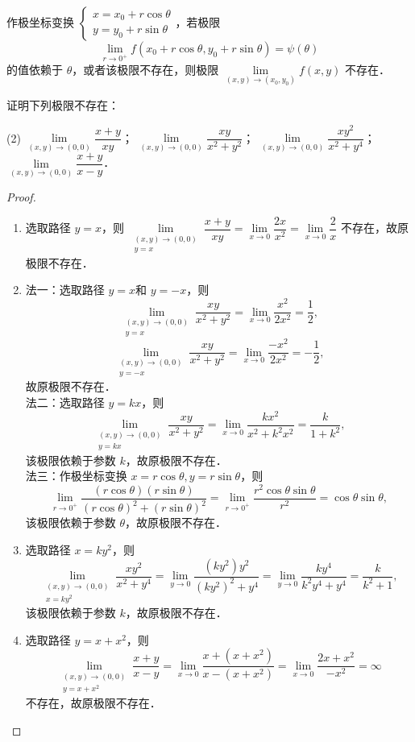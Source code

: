 \documentclass[12pt, a4paper, oneside, UTF8]{ctexbook}
\begin{document}
\begin{theorem}[极坐标法]
作极坐标变换 $\begin{cases} x=x_0+r\cos\theta \\ y=y_0+r\sin\theta \end{cases}$，若极限
\[ \lim_{r \to 0^+} f(x_0+r\cos\theta, y_0+r\sin\theta) = \psi(\theta) \]
的值依赖于 $\theta$，或者该极限不存在，则极限 $\lim\limits_{(x,y) \to (x_0,y_0)} f(x,y)$ 不存在．
\end{theorem}
\begin{example}
    证明下列极限不存在：
    \begin{tasks}[label=(\arabic*)](2)
        \task $\lim\limits_{(x,y) \to (0,0)} \dfrac{x+y}{xy}$；
        \task $\lim\limits_{(x,y) \to (0,0)} \dfrac{xy}{x^2+y^2}$；
        \task $\lim\limits_{(x,y) \to (0,0)} \dfrac{xy^2}{x^2+y^4}$；
        \task $\lim\limits_{(x,y) \to (0,0)} \dfrac{x+y}{x-y}$．
    \end{tasks}
\end{example}
\begin{proof}
    \begin{enumerate}[label=(\arabic*)]
        \item 选取路径 $y=x$，则 $\lim\limits_{\substack{(x,y) \to (0,0) \\ y=x}} \dfrac{x+y}{xy} = \lim\limits_{x \to 0} \dfrac{2x}{x^2} = \lim\limits_{x \to 0} \dfrac{2}{x}$ 不存在，故原极限不存在．
        \item 法一：选取路径 $y=x$和 $y=-x$，则
        \[ \lim_{\substack{(x,y) \to (0,0) \\ y=x}} \dfrac{xy}{x^2+y^2} = \lim_{x \to 0} \dfrac{x^2}{2x^2} = \dfrac{1}{2}, \]
        \[ \lim_{\substack{(x,y) \to (0,0) \\ y=-x}} \dfrac{xy}{x^2+y^2} = \lim_{x \to 0} \dfrac{-x^2}{2x^2} = -\dfrac{1}{2}, \]
        故原极限不存在．\\
        法二：选取路径 $y=kx$，则
        \[ \lim_{\substack{(x,y) \to (0,0) \\ y=kx}} \dfrac{xy}{x^2+y^2} = \lim_{x \to 0} \dfrac{kx^2}{x^2+k^2x^2} = \dfrac{k}{1+k^2}, \]
        该极限依赖于参数 $k$，故原极限不存在．\\
        法三：作极坐标变换 $x=r\cos\theta, y=r\sin\theta$，则
        \[ \lim_{r \to 0^+} \dfrac{(r\cos\theta)(r\sin\theta)}{(r\cos\theta)^2+(r\sin\theta)^2} = \lim_{r \to 0^+} \dfrac{r^2\cos\theta\sin\theta}{r^2} = \cos\theta\sin\theta, \]
        该极限依赖于参数 $\theta$，故原极限不存在．
        \item 选取路径 $x = ky^2$，则
        \[ \lim_{\substack{(x,y) \to (0,0) \\ x=ky^2}} \dfrac{xy^2}{x^2+y^4} = \lim_{y \to 0} \dfrac{(ky^2)y^2}{(ky^2)^2+y^4} = \lim_{y \to 0} \dfrac{ky^4}{k^2y^4+y^4} = \dfrac{k}{k^2+1}, \]
        该极限依赖于参数 $k$，故原极限不存在．
        \item 选取路径 $y = x + x^2$，则
        \[ \lim_{\substack{(x,y) \to (0,0) \\ y=x+x^2}} \dfrac{x+y}{x-y} = \lim_{x \to 0} \dfrac{x+(x+x^2)}{x-(x+x^2)} = \lim_{x \to 0} \dfrac{2x+x^2}{-x^2} =\infty \]
        不存在，故原极限不存在．
    \end{enumerate}
\end{proof}
\end{document}

